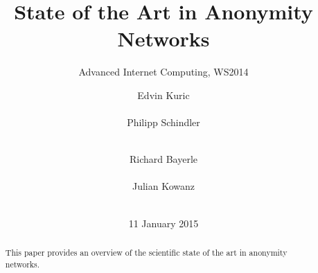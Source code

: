 \documentclass{sig-alternate}
\begin{document}
%

\title{State of the Art in Anonymity Networks}
\subtitle{Advanced Internet Computing, WS2014}

\author{
\alignauthor
Edvin Kuric\\
       \\
\alignauthor
Philipp Schindler\\
       \\
\and
\alignauthor Richard Bayerle\\
       \\
\alignauthor Julian Kowanz\\
       \\
}
\date{11 January 2015}
\maketitle


\begin{abstract}
This paper provides an overview of the scientific state of the art in anonymity networks.
\end{abstract}

\end{document}
